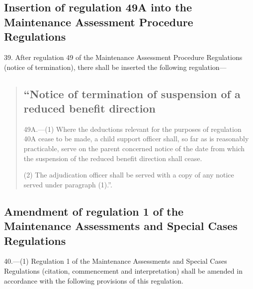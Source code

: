 \documentclass[a4paper]{article}
\begin{document}
\subsection[39. Insertion of regulation 49A into the Maintenance Assessment Procedure Regulations]{Insertion of regulation 49A into the Maintenance Assessment Procedure Regulations}

39.  After regulation 49 of the Maintenance Assessment Procedure Regulations (notice of termination), there shall be inserted the following regulation—
\begin{quotation}
\subsection*{“Notice of termination of suspension of a reduced benefit direction}

49A.—(1) Where the deductions relevant for the purposes of regulation 40A cease to be made, a child support officer shall, so far as is reasonably practicable, serve on the parent concerned notice of the date from which the suspension of the reduced benefit direction shall cease.

(2) The adjudication officer shall be served with a copy of any notice served under paragraph (1).”.
\end{quotation}

\subsection[40. Amendment of regulation 1 of the Maintenance Assessments and Special Cases Regulations]{Amendment of regulation 1 of the Maintenance Assessments and Special Cases Regulations}

40.—(1) Regulation 1 of the Maintenance Assessments and Special Cases Regulations (citation, commencement and interpretation) shall be amended in accordance with the following provisions of this regulation.
\end{document}
